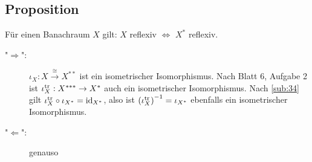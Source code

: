 \subsection[Proposition: Für Banachräume gilt: $X$ reflexiv $\iff$ $X^*$ reflexiv]{Proposition} %
\label{sub:515}
Für einen Banachraum $X$ gilt: $X$ reflexiv $\iff$ $X^*$ reflexiv.
\begin{description}
	\item["$\Rightarrow$":] $\iota_X : X \xrightarrow{\cong} X^{**}$ ist ein isometrischer Isomorphismus. Nach Blatt 6, Aufgabe 2 ist $\iota_X^{\tr} : X^{***} \to X^*$
	auch ein isometrischer Isomorphismus. Nach \ref{sub:34} gilt  $\iota_X^{\tr} \circ \iota_{X^*}= \id_{X^{*}}$, also ist $\enbrace*{\iota_X^\tr}^{-1} = \iota_{X^*}$
	ebenfalls ein isometrischer Isomorphismus.
	\item["$\Leftarrow$":] genauso \checkmark \bewende
\end{description}


